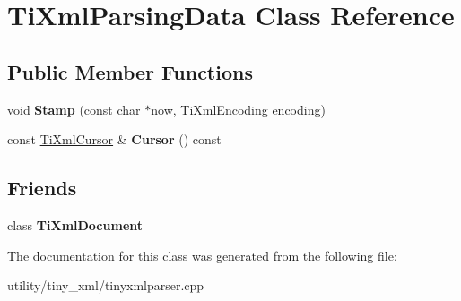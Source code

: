 \hypertarget{class_ti_xml_parsing_data}{}\section{Ti\+Xml\+Parsing\+Data Class Reference}
\label{class_ti_xml_parsing_data}
\subsection*{Public Member Functions}
\begin{DoxyCompactItemize}
\item 
\mbox{\label{class_ti_xml_parsing_data_a65cee8ab77a36c605db08c84b4c30a7d}} 
void {\bfseries Stamp} (const char $\ast$now, Ti\+Xml\+Encoding encoding)
\item 
\mbox{\label{class_ti_xml_parsing_data_a02ba4903fd3b70b43524ad60a4eece7c}} 
const \hyperlink{struct_ti_xml_cursor}{Ti\+Xml\+Cursor} \& {\bfseries Cursor} () const
\end{DoxyCompactItemize}
\subsection*{Friends}
\begin{DoxyCompactItemize}
\item 
\mbox{\label{class_ti_xml_parsing_data_a173617f6dfe902cf484ce5552b950475}} 
class {\bfseries Ti\+Xml\+Document}
\end{DoxyCompactItemize}


The documentation for this class was generated from the following file\+:\begin{DoxyCompactItemize}
\item 
utility/tiny\+\_\+xml/tinyxmlparser.\+cpp\end{DoxyCompactItemize}
